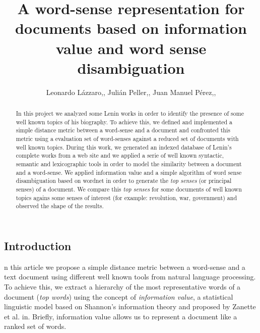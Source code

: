 \documentclass{pnastwo}
\begin{document}
\title{A word-sense representation for documents based on information value and word sense disambiguation}

\author{Leonardo Lázzaro,,
Julián Peller,,
Juan Manuel Pérez,,
}


\maketitle

\begin{article}
\begin{abstract}
In this project we analyzed some Lenin works in order to identify the presence of some well known topics of his biography. To achieve this, we defined and implemented a simple distance metric between a word-sense and a document and confronted this metric using a evaluation set of word-senses against a reduced set of  documents with well known topics. During this work, we generated an indexed database of Lenin's complete works from a web site\cite{LENIN} and we applied a serie of well known syntactic, semantic and lexicographic tools in order to model the similarity between a document and a word-sense. We applied information value\cite{DARWIN} and a simple algorithm of word sense disambiguation\cite{LESK} based on wordnet\cite{WORDNET} in order to generate the \textit{top senses} (or principal senses) of a document. We compare this \textit{top senses} for some documents of well known topics agains some senses of interest (for example: revolution, war, government) and observed the shape of the results. 
\end{abstract}



\section{Introduction}

n this article we propose a simple distance metric between a word-sense and a text document using different well known tools from natural language processing. To achieve this, we extract a hierarchy of the most representative words of a document (\textit{top words}) using the concept of \textit{information value}, a statistical linguistic model based on Shannon's information theory and proposed by Zanette et al. in\cite{DARWIN}. Briefly, information value allows us to represent a document like a ranked set of words. 


\end{article}
\end{document}
